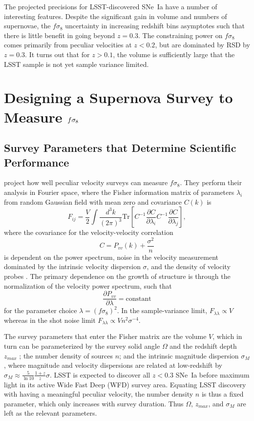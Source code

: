 \documentclass{aastex62}   	%
\begin{document}
The projected precisions for LSST-discovered SNe~Ia have a number of interesting features. 
Despite the significant gain in volume and numbers of supernovae, the $f\sigma_8$ uncertainty in increasing redshift bins asymptotes such that 
there is little benefit in going beyond
$z=0.3$.
The constraining power on  $f\sigma_8$ 
comes primarily from peculiar velocities
at $z<0.2$, but are dominated by RSD by $z=0.3$.
It turns out that for $z>0.1$, the volume is sufficiently large that the LSST sample is not yet sample variance limited.

\section{Designing a Supernova Survey to Measure $\MakeLowercase{f}\sigma_8$}
\subsection{Survey Parameters that Determine Scientific Performance}
\citet{2017ApJ...847..128H} project how well peculiar velocity surveys can measure $f\sigma_8$. 
They perform their analysis in Fourier space, 
where the Fisher information matrix of parameters $\lambda_i$ from random Gaussian field with mean zero and covariance $C(k)$ is
\begin{equation}
F_{ij} = \frac{V}{2}\int \frac{d^3k}{(2\pi)^3} \text{Tr}\left[ C^{-1} \frac{\partial C}{\partial \lambda_i} C^{-1}
\frac{\partial C}{\partial \lambda_j} \right],
\end{equation}
where the covariance for the velocity-velocity correlation
\begin{equation}
C = P_{vv}(k) + \frac{\sigma^2}{n}
\label{cov:eq}
\end{equation}
is dependent on the power spectrum, noise in the velocity measurement dominated by the intrinsic velocity dispersion $\sigma$, and the density of velocity probes
\citep{2017MNRAS.464.2517H}.  
The primary dependence on the growth of structure is through the normalization of the velocity power spectrum, such that 
\begin{equation}
 \frac{\partial P_{vv}}{\partial \lambda} = \text{constant}
\end{equation}
for the parameter choice
$\lambda=(f\sigma_8)^2$.  In the sample-variance limit, $F_{\lambda \lambda} \propto V$ whereas in the shot noise limit $F_{\lambda \lambda} \propto V n^2 \sigma^{-4}$.


The survey parameters that  enter the Fisher matrix are the volume $V$, which
in turn can be parameterized by the survey solid angle $\Omega$ and the redshift depth $z_{max}$ ; the number density of sources $n$; and the intrinsic
magnitude dispersion $\sigma_M$, where magnitude and velocity dispersions are related at low-redshift by $\sigma_{M} \approx \frac{5}{\ln{10}} \frac{1+z}{z} \sigma$.
LSST is expected to discover all $z<0.3$ SNe~Ia before maximum light in its active Wide Fast Deep (WFD) survey area.
Equating LSST discovery with having a meaningful peculiar velocity, the number density $n$ is thus a fixed parameter, which only increases with survey duration.
Thus $\Omega$, $z_{max}$, and $\sigma_M$ are left as the relevant parameters.
\end{document}
